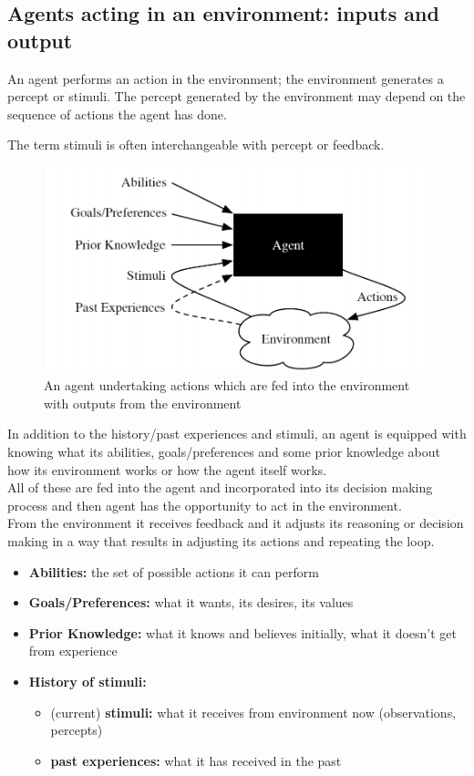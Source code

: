 \documentclass[12pt]{article}
\begin{document}
\newpage
\subsection{Agents acting in an environment: inputs and output}
An agent performs an action in the environment; the environment generates a percept or stimuli. The percept generated by the environment may depend on the sequence of actions the agent has done.

The term stimuli is often interchangeable with percept or feedback.

\begin{figure}[h!]
        \centering
        \includegraphics[scale=0.5]{agent-inputs-output.png}
        \caption{An agent undertaking actions which are fed into the environment with outputs from the environment}
        \label{fig:my_label}
\end{figure}

\noindent In addition to the history/past experiences and stimuli, an agent is equipped with knowing what its abilities, goals/preferences and some prior knowledge about how its environment works or how the agent itself works.\\
All of these are fed into the agent and incorporated into its decision making process and then agent has the opportunity to act in the environment.\\
From the environment it receives feedback and it adjusts its reasoning or decision making in a way that results in adjusting its actions and repeating the loop.

\begin{itemize}
    \item \textbf{Abilities:} the set of possible actions it can perform
    \item \textbf{Goals/Preferences:} what it wants, its desires, its values
    \item \textbf{Prior Knowledge:} what it knows and believes initially, what it doesn't get from experience
    \item \textbf{History of stimuli:}
    \begin{itemize}
        \item (current) \textbf{stimuli:} what it receives from environment now (observations, percepts)
        \item \textbf{past experiences:} what it has received in the past
    \end{itemize}
\end{itemize}
\end{document}
